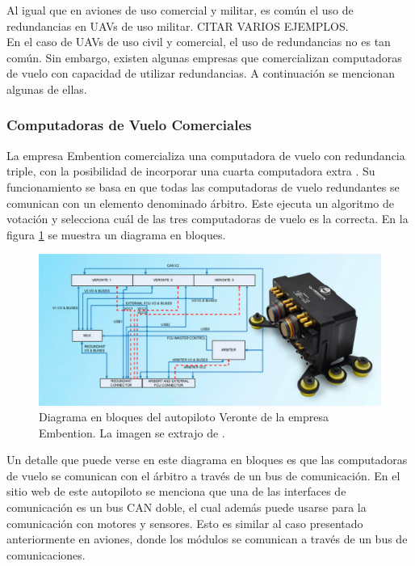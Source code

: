 Al igual que en aviones de uso comercial y militar, es común el uso de redundancias en UAVs de uso militar. {\color{red} CITAR VARIOS EJEMPLOS}.\\

En el caso de UAVs de uso civil y comercial, el uso de redundancias no es tan común. Sin embargo, existen algunas empresas que comercializan computadoras de vuelo con capacidad de utilizar redundancias. A continuación se mencionan algunas de ellas.\\

\subsubsection{Computadoras de Vuelo Comerciales}

La empresa Embention comercializa una computadora de vuelo con redundancia triple, con la posibilidad de incorporar una cuarta computadora extra \cite{embention-2023}. Su funcionamiento se basa en que todas las computadoras de vuelo redundantes se comunican con un elemento denominado árbitro. Este ejecuta un algoritmo de votación y selecciona cuál de las tres computadoras de vuelo es la correcta. En la figura \ref{fig:Veronte_Embention} se muestra un diagrama en bloques.

\begin{figure}[H]
    \centering
    \includegraphics[width=\textwidth]{img/Veronte_Embention.png}
    \caption{Diagrama en bloques del autopiloto Veronte de la empresa Embention. La imagen se extrajo de \cite{embention-2023}.}
    \label{fig:Veronte_Embention}    
\end{figure}

Un detalle que puede verse en este diagrama en bloques es que las computadoras de vuelo se comunican con el árbitro a través de un bus de comunicación. En el sitio web de este autopiloto se menciona que una de las interfaces de comunicación es un bus CAN doble, el cual además puede usarse para la comunicación con motores y sensores. Esto es similar al caso presentado anteriormente en aviones, donde los módulos se comunican a través de un bus de comunicaciones.\\


